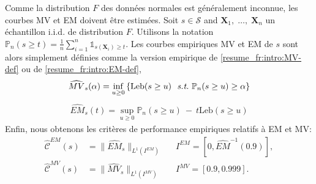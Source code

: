 \documentclass[a4paper, 12pt]{article}
\newcommand{\st}{\emph{s.t.}{}}
\newcommand{\crit}{\mathcal{C}}
\def\mb{\mathbf}
\def\S{\mathcal{S}}
\def\crit{\mathcal{C}}
\def\leb{\text{Leb}}
\begin{document}
Comme la distribution $F$ des données normales est généralement inconnue, les courbes MV et EM doivent être estimées.
Soit $s\in \mathcal{S}$ and $\mb X_1,\; \ldots,\; \mb X_n$ un échantillon  i.i.d. de distribution $F$. Utilisons la notation $\mathbb{P}_n(s \ge t)=\frac{1}{n}\sum_{i=1}^n\mathds{1}_{s(\mb X_i)\geq t}.$ 
Les courbes empiriques MV et EM de $s$ sont alors simplement définies comme la version empirique de \eqref{resume_fr:intro:MV-def} ou de \eqref{resume_fr:intro:EM-def}, 
\begin{align}
\label{resume_fr:MV-def-emp}
\widehat{MV}_s(\alpha) = \inf_{u \ge 0} \left\{ \leb(s \ge u) ~~\st~ \mathbb{P}_n(s \ge u) \ge \alpha \right\}
\end{align}
\begin{align}
\label{resume_fr:EM-def-emp}
\widehat{EM}_s(t) = \sup_{u \ge 0} \mathbb{P}_n(s \ge u) ~-~ t \leb(s \ge u)
\end{align}
%
%
Enfin, nous obtenons les critères de performance empiriques relatifs à EM et MV:
\begin{align}
\label{resume_fr:eq:standard_emp_EM}\widehat{\crit}^{EM}(s) &= \| \widehat{EM}_s \|_{L^1(I^{EM})}  &&I^{EM} = [0,\widehat{EM}^{-1}(0.9)],\\
\label{resume_fr:eq:standard_emp_MV}\widehat{\crit}^{MV}(s) &= \| \widehat{MV}_s \|_{L^1(I^{MV})}  &&I^{MV} = [0.9, 0.999].
\end{align}
%

%
\end{document}

